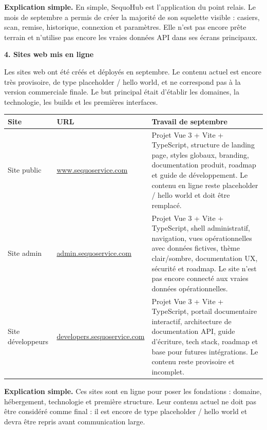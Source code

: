 \documentclass[11pt,letterpaper]{article}
\newcommand{\subsectiontitle}[1]{%
  \vspace{0.35em}
  {\large\bfseries\color{SequoInk}#1}\par
}
\newcommand{\simpleexplanation}[1]{%
  {\small\textbf{\color{SequoBlue}Explication simple.} \color{SequoMuted}#1\par}
}
\begin{document}
\simpleexplanation{En simple, SequoHub est l'application du point relais. Le mois de septembre a permis de créer la majorité de son squelette visible : casiers, scan, remise, historique, connexion et paramètres. Elle n'est pas encore prête terrain et n'utilise pas encore les vraies données API dans ses écrans principaux.}

\subsectiontitle{4. Sites web mis en ligne}
Les sites web ont été créés et déployés en septembre. Le contenu actuel est encore très provisoire, de type placeholder / hello world, et ne correspond pas à la version commerciale finale. Le but principal était d'établir les domaines, la technologie, les builds et les premières interfaces.

{\small
\begin{tabularx}{\linewidth}{@{}L{3.1cm}L{4.6cm}Y@{}}
\toprule
{}
\textbf{Site} & \textbf{URL} & \textbf{Travail de septembre} \\
\midrule
Site public & \href{https://www.sequoservice.com}{www.sequoservice.com} & Projet Vue 3 + Vite + TypeScript, structure de landing page, styles globaux, branding, documentation produit, roadmap et guide de développement. Le contenu en ligne reste placeholder / hello world et doit être remplacé. \\
Site admin & \href{https://admin.sequoservice.com}{admin.sequoservice.com} & Projet Vue 3 + Vite + TypeScript, shell administratif, navigation, vues opérationnelles avec données fictives, thème clair/sombre, documentation UX, sécurité et roadmap. Le site n'est pas encore connecté aux vraies données opérationnelles. \\
Site développeurs & \href{https://developers.sequoservice.com}{developers.sequoservice.com} & Projet Vue 3 + Vite + TypeScript, portail documentaire interactif, architecture de documentation API, guide d'écriture, tech stack, roadmap et base pour futures intégrations. Le contenu reste provisoire et incomplet. \\
\bottomrule
\end{tabularx}
}

\simpleexplanation{Ces sites sont en ligne pour poser les fondations : domaine, hébergement, technologie et première structure. Leur contenu actuel ne doit pas être considéré comme final : il est encore de type placeholder / hello world et devra être repris avant communication large.}
\end{document}
